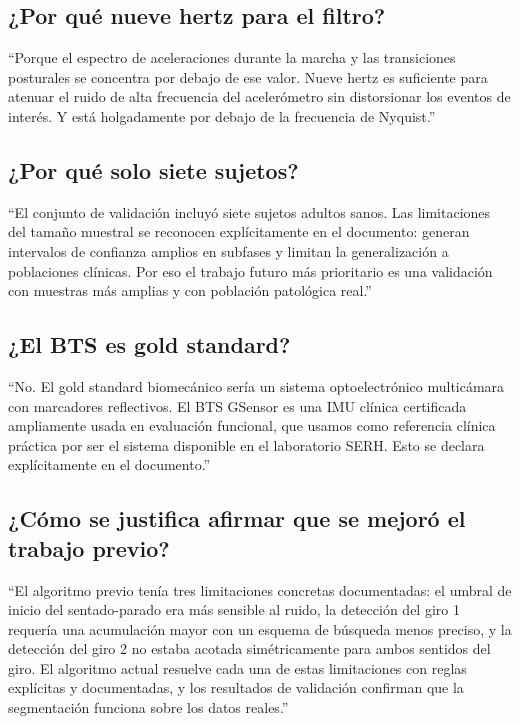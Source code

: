 \documentclass[12pt]{article}
\begin{document}
\subsection*{¿Por qué nueve hertz para el filtro?}

``Porque el espectro de aceleraciones durante la marcha y las transiciones posturales se concentra por debajo de ese valor. Nueve hertz es suficiente para atenuar el ruido de alta frecuencia del acelerómetro sin distorsionar los eventos de interés. Y está holgadamente por debajo de la frecuencia de Nyquist.''

\subsection*{¿Por qué solo siete sujetos?}

``El conjunto de validación incluyó siete sujetos adultos sanos. Las limitaciones del tamaño muestral se reconocen explícitamente en el documento: generan intervalos de confianza amplios en subfases y limitan la generalización a poblaciones clínicas. Por eso el trabajo futuro más prioritario es una validación con muestras más amplias y con población patológica real.''

\subsection*{¿El BTS es gold standard?}

``No. El gold standard biomecánico sería un sistema optoelectrónico multicámara con marcadores reflectivos. El BTS GSensor es una IMU clínica certificada ampliamente usada en evaluación funcional, que usamos como referencia clínica práctica por ser el sistema disponible en el laboratorio SERH. Esto se declara explícitamente en el documento.''

\subsection*{¿Cómo se justifica afirmar que se mejoró el trabajo previo?}

``El algoritmo previo tenía tres limitaciones concretas documentadas: el umbral de inicio del sentado-parado era más sensible al ruido, la detección del giro 1 requería una acumulación mayor con un esquema de búsqueda menos preciso, y la detección del giro 2 no estaba acotada simétricamente para ambos sentidos del giro. El algoritmo actual resuelve cada una de estas limitaciones con reglas explícitas y documentadas, y los resultados de validación confirman que la segmentación funciona sobre los datos reales.''
\end{document}
